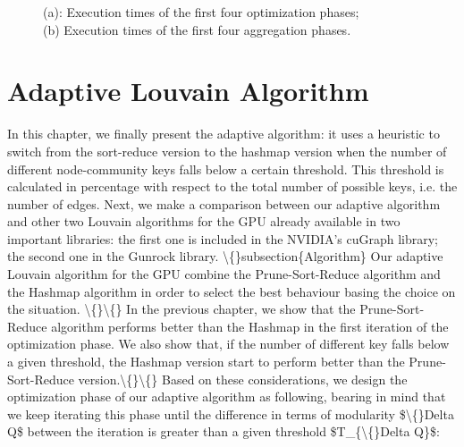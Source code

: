 \begin{figure}[t!]
	\caption{(a): Execution times of the first four optimization phases;\\(b) Execution times of the first four aggregation phases.}
\end{figure}
\newpage
\section{Adaptive Louvain Algorithm}\label{C7}
In this chapter, we finally present the adaptive algorithm: it uses a heuristic to switch from the sort-reduce version to the hashmap version when the number of different node-community keys falls below a certain threshold. This threshold is calculated in percentage with respect to the total number of possible keys, i.e. the number of edges.
Next, we make a comparison between our adaptive algorithm and other two Louvain algorithms for the GPU already available in two important libraries: the first one is included in the NVIDIA's cuGraph library; the second one in the Gunrock library.
\textbackslash\{\}subsection\{Algorithm\}
Our adaptive Louvain algorithm for the GPU combine the Prune-Sort-Reduce algorithm and the Hashmap algorithm in order to select the best behaviour basing the choice on the situation. \textbackslash\{\}\textbackslash\{\} In the previous chapter, we show that the Prune-Sort-Reduce algorithm performs better than the Hashmap in the first iteration of the optimization phase. We also show that, if the number of different key falls below a given threshold, the Hashmap version start to perform better than the Prune-Sort-Reduce version.\textbackslash\{\}\textbackslash\{\}  
Based on these considerations, we design the optimization phase of our adaptive algorithm as following, bearing in mind that we keep iterating this phase until the difference in terms of modularity \$\textbackslash\{\}Delta Q\$ between the iteration is greater than a given threshold \$T\_\{\textbackslash\{\}Delta Q\}\$:
